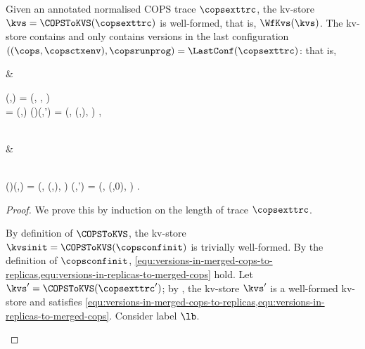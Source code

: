 \begin{toappendix}
\label{sec:cops-well-formed-encoded-kv-store}
\begin{proposition}
\label{prop:cops-well-formed-kvs}
Given an annotated normalised COPS trace \( \copsexttrc \),
the kv-store \( \kvs = \COPSToKVS(\copsexttrc) \) is well-formed,
that is, \( \WfKvs(\kvs) \).
The kv-store contains and only contains versions 
in the last configuration \( ((\cops,\copsctxenv),\copsrunprog) = \LastConf(\copsexttrc) \):
that is,
\begin{Formulae}
& \begin{Formula}
    \Forall{\key \in \Keys | \idx \in \Indexs | \val \in \Values | \copstxid \in \COPSTxIDs }
    \kvs(\key,\idx) = (\val, \copstxid, \stub )
    \\ \implies 
    \copstxid = \copstxid[\stub][\repl](\ts,\stub)
    \cops(\repl)(\key,\idx') = (\val, (\ts,\repl), \stub ) ,
    \label{equ:versions-in-merged-cops-to-replicas}
\end{Formula}
\\ & \begin{Formula}
    \Forall{\key \in \Keys | \idx \in \Indexs | \val \in \Values | \repl, \ts}
    \\ \cops(\repl)(\key,\idx) = (\val, (\ts,\repl), \stub ) 
    \implies 
    \kvs(\key,\idx') = (\val, \copstxid[\cl][\repl](\ts,0), \stub ) .
    \label{equ:versions-in-replicas-to-merged-cops}
\end{Formula}
\end{Formulae}
\end{proposition}
\begin{proof}
We prove this by induction on the length of trace \( \copsexttrc \).
\begin{enumerate}
\Cases{\( \copsexttrc = \copsconfinit \)}
    By definition of \( \COPSToKVS \), 
    the kv-store \(\kvsinit = \COPSToKVS(\copsconfinit) \) is trivially well-formed.
    By the definition of \( \copsconfinit \), 
    \cref{equ:versions-in-merged-cops-to-replicas,equ:versions-in-replicas-to-merged-cops} hold.
    Let \( \kvs' = \COPSToKVS(\copsexttrc') \);
    by \ih, the kv-store \( \kvs' \) is a well-formed kv-store 
    and satisfies \cref{equ:versions-in-merged-cops-to-replicas,equ:versions-in-replicas-to-merged-cops}.
    Consider label \( \lb \).

\end{enumerate}
\end{proof}
\end{toappendix}

